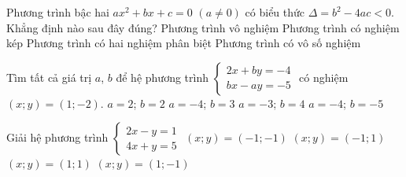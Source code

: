 \begin{ex}%
	 Phương trình bậc hai $ax^2+bx+c=0$ $(a \neq 0)$ có biểu thức $\Delta=b^2-4ac<0$. Khẳng định nào sau đây đúng?
	\choice
	{\True Phương trình vô nghiệm} 
	{Phương trình có nghiệm kép}
	{Phương trình có hai nghiệm phân biệt}
	{Phương trình có vô số nghiệm}
	
\end{ex}
\begin{ex}%
	 Tìm tất cả giá trị $a$, $b$ để hệ phương trình $\begin{cases}2x+by=-4\\bx-ay=-5\end{cases}$ có nghiệm $(x;y)=(1;-2)$.
	\choice
	{$a=2$; $b=2$}
	{\True $a=-4$; $b=3$}
	{$a=-3$; $b=4 $}
	{$a=-4$; $b=-5$}
\end{ex}

\begin{ex}%
	 Giải hệ phương trình $\begin{cases}2x-y=1\\4x+y=5\end{cases}$
	\choice
	{ $(x;y)=(-1;-1)$}
	{$(x;y)=(-1;1)$}
	{\True $(x;y)=(1;1)$}
	{$(x;y)=(1;-1)$}
	
\end{ex}

